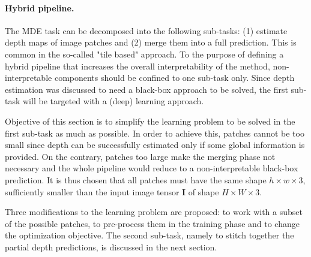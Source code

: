 \paragraph{Hybrid pipeline.}
The MDE task can be decomposed into the following sub-tasks: (1) estimate depth maps of image patches and (2) merge them into a full prediction.
This is common in the so-called "tile based" approach.
To the purpose of defining a hybrid pipeline that increases the overall interpretability of the method, non-interpretable components should be confined to one sub-task only.
Since depth estimation was discussed to need a black-box approach to be solved, the first sub-task will be targeted with a (deep) learning approach.

Objective of this section is to simplify the learning problem to be solved in the first sub-task as much as possible.
In order to achieve this, patches cannot be too small since depth can be successfully estimated only if some global information is provided.
On the contrary, patches too large make the merging phase not necessary and the whole pipeline would reduce to a non-interpretable black-box prediction.
It is thus chosen that all patches must have the same shape $h \times w \times 3$, sufficiently smaller than the input image tensor $\mathbf{I}$ of shape $H \times W \times 3$.

Three modifications to the learning problem are proposed: to work with a subset of the possible patches, to pre-process them in the training phase and to change the optimization objective.
The second sub-task, namely to stitch together the partial depth predictions, is discussed in the next section.

\vspace{0.5cm}

